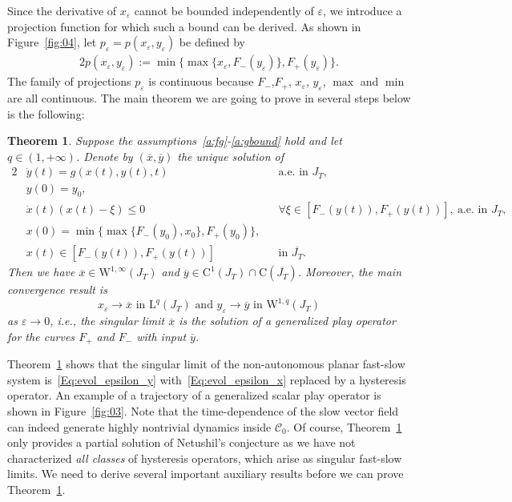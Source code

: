 \documentclass[12pt]{article}
\newtheorem{thm}{Theorem}[section]
\def\I{\infty}
\newcommand{\benn}{\begin{equation*}}
\newcommand{\eenn}{\end{equation*}}
\def\I{\infty}
\newcommand{\cC}{{\mathcal C}}  %
\begin{document}
Since the derivative of $x_\varepsilon$ cannot be bounded independently of $\varepsilon$, 
we introduce a projection function for which such a bound can be derived. As shown in 
Figure~\ref{fig:04}, let $p_{\varepsilon}=p(x_\varepsilon,y_\varepsilon)$ be 
defined by
\begin{alignat*}{2}
p(x_\varepsilon,y_\varepsilon):= \min\{\max\{
x_\varepsilon, F_-(y_\varepsilon)\},F_+(y_\varepsilon)\}.
\end{alignat*}
The family of projections $p_\varepsilon$ is continuous because $F_-$,$F_+$, $x_\varepsilon$, 
$y_\varepsilon$, $\max$ and $\min$ are all continuous. The main theorem we are going to 
prove in several steps below is the following:

\begin{thm}
\label{thm:projection}
Suppose the assumptions~\ref{a:fg}-\ref{a:gbound} hold and let $q\in(1,+\I)$. Denote 
by $(\overline{x},\overline{y})$ the unique solution of
\begin{alignat}{2}
&\dot{y}(t) = g(x(t),y(t),t)\ && \text{a.e. in } J_T,\label{Eq:evol_x_1}\\
& y(0) = y_0,\label{Eq:evol_x_2}\\
&\dot{x}(t)(x(t)-\xi) \leq 0 && \forall\xi\in [F_-(y(t)), F_+(y(t))],\ 
\text{a.e. in } J_T,\label{Eq:evol_y_1}\\
&x(0) = \min \{\max \{F_-(y_0) , x_0\} ,F_+	(y_0)\},\label{Eq:evol_y_2}\\
&x(t)\in [F_-(y(t)), F_+(y(t))] && 
\text{in }\overline{J_T}.\label{Eq:evol_y_3}
\end{alignat}
Then we have $\overline{x}\in \mathrm{W}^{1,\infty}(J_T)$ and $\overline{y}\in 
\mathrm{C}^1(J_T)\cap \mathrm{C}(\overline{J_T})$. Moreover, the main convergence result is
\benn
x_\varepsilon \rightarrow \overline{x} \text{ in } \mathrm{L}^{q}(J_T)	\text{ and }
y_{\varepsilon} \rightarrow \overline{y} \text{ in } \mathrm{W}^{1,q}(J_T)
\eenn
as $\varepsilon\rightarrow 0$, i.e., the singular limit $\overline{x}$ is the solution 
of a generalized play operator for the curves $F_+$ and $F_-$ with input $\overline{y}$. 
\end{thm}

Theorem~\ref{thm:projection} shows that the singular limit of the non-autonomous planar 
fast-slow system is~\eqref{Eq:evol_epsilon_y} with~\eqref{Eq:evol_epsilon_x} replaced by 
a hysteresis operator. An example of a trajectory of a generalized scalar play operator is shown in 
Figure~\ref{fig:03}. Note that the time-dependence of the slow vector field can indeed
generate highly nontrivial dynamics inside $\cC_0$. Of course, Theorem~\ref{thm:projection}
only provides a partial solution of Netushil's conjecture as we have not characterized 
\emph{all classes} of hysteresis operators, which arise as singular fast-slow limits. 
We need to derive several important auxiliary results before we can prove 
Theorem~\ref{thm:projection}.
\end{document}
